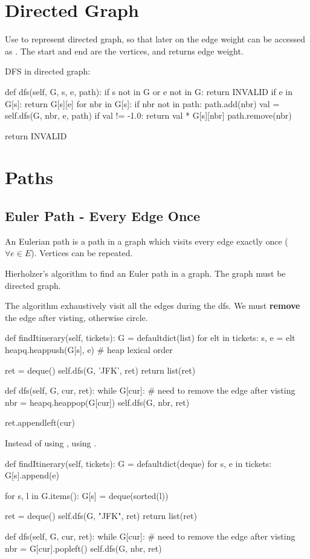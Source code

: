 \section{Directed Graph}
Use  to represent directed graph, so that later on the edge weight can be accessed as . The  start and  end are the vertices, and  returns edge weight.

 DFS in directed graph:
\begin{python}
def dfs(self, G, s, e, path):
    if s not in G or e not in G:
        return INVALID
    if e in G[s]:
        return G[s][e]
    for nbr in G[s]:
        if nbr not in path:
            path.add(nbr)
            val = self.dfs(G, nbr, e, path)
            if val != -1.0:
                return val * G[s][nbr]
            path.remove(nbr)

    return INVALID
\end{python}

\section{Paths}
\subsection{Euler Path - Every Edge Once} 
An Eulerian path is a path in a graph which visits every edge exactly once ($\forall e \in E$). Vertices can be repeated.

Hierholzer's algorithm to find an Euler path in a graph. The graph must be directed graph.

 The algorithm exhaustively visit all the edges during the dfs. We must \textbf{remove} the edge after visting, otherwise circle.
\begin{python}
def findItinerary(self, tickets):
    G = defaultdict(list)
    for elt in tickets:
        s, e = elt
        heapq.heappush(G[s], e)  # heap lexical order

    ret = deque()
    self.dfs(G, 'JFK', ret)
    return list(ret)

def dfs(self, G, cur, ret):
    while G[cur]:
        # need to remove the edge after visting
        nbr = heapq.heappop(G[cur])
        self.dfs(G, nbr, ret)

    ret.appendleft(cur)
\end{python}

Instead of using , using .
\begin{python}
def findItinerary(self, tickets):
    G = defaultdict(deque)
    for s, e in tickets:
        G[s].append(e)
    
    for s, l in G.items():
        G[s] = deque(sorted(l))
    
    ret = deque()
    self.dfs(G, "JFK", ret)
    return list(ret)

def dfs(self, G, cur, ret):
    while G[cur]:
        # need to remove the edge after visting
        nbr = G[cur].popleft()
        self.dfs(G, nbr, ret)
\end{python}

